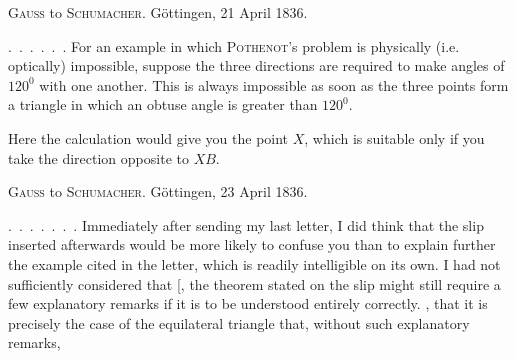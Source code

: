 
\begin{center}
\textsc{Gauss} to \textsc{Schumacher}. Göttingen, 21 April 1836.
\end{center}

\indent \mbox{. . . . . .} For an example in which \textsc{Pothenot}'s problem is physically (i.e. optically) impossible, suppose the three directions are required to make angles of $120^0$ with one another. This is always impossible as soon as the three points form a triangle in which an obtuse angle is greater than $120^0$.

\begin{center}\end{center}

Here the calculation would give you the point $X$, which is suitable only if you take the direction opposite to $XB$.

\begin{center}
\textsc{Gauss} to \textsc{Schumacher}. Göttingen, 23 April 1836.
\end{center}

\indent \mbox{. . . . . . .} Immediately after sending my last letter, I did think that the slip inserted afterwards would be more likely to confuse you than to explain further the example cited in the letter, which is readily intelligible on its own. I had not sufficiently considered that [, the  theorem stated on the slip might still require a few explanatory remarks if it is to be understood entirely correctly. , that it is precisely the case of the equilateral triangle that, without such explanatory remarks,\space%
